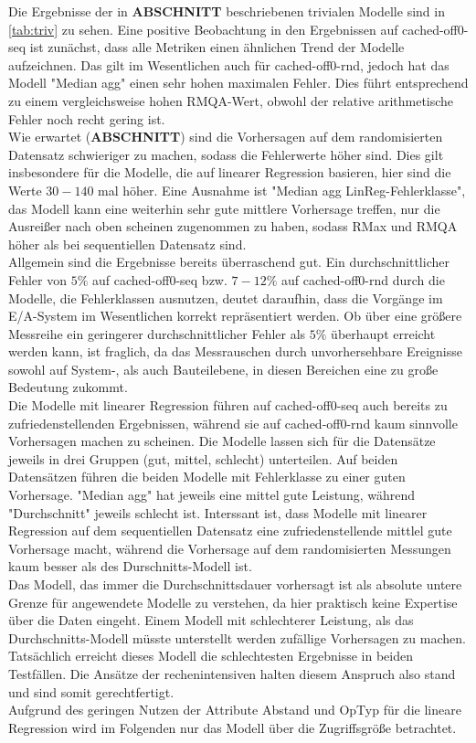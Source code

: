\documentclass[
	12pt,
	a4paper,
	BCOR10mm,
	DIV14,
	listof=totoc,
	bibliography=totoc,
	headsepline
]{scrreprt}
\begin{document}
Die Ergebnisse der in \textbf{ABSCHNITT} beschriebenen trivialen Modelle sind in \ref{tab:triv} zu sehen. Eine positive Beobachtung in den Ergebnissen auf cached-off0-seq ist zunächst, dass alle Metriken einen ähnlichen Trend der  Modelle aufzeichnen. Das gilt im Wesentlichen auch für cached-off0-rnd, jedoch hat das Modell "Median agg" einen sehr hohen maximalen Fehler. Dies führt entsprechend zu einem vergleichsweise hohen RMQA-Wert, obwohl der relative arithmetische Fehler noch recht gering ist. \\
Wie erwartet (\textbf{ABSCHNITT}) sind die Vorhersagen auf dem randomisierten Datensatz schwieriger zu machen, sodass die Fehlerwerte höher sind. Dies gilt insbesondere für die Modelle, die auf linearer Regression basieren, hier sind die Werte $30-140$ mal höher. Eine Ausnahme ist "Median agg LinReg-Fehlerklasse", das Modell kann eine weiterhin sehr gute mittlere Vorhersage treffen, nur die Ausreißer nach oben scheinen zugenommen zu haben, sodass RMax und RMQA höher als bei sequentiellen Datensatz sind.\\
Allgemein sind die Ergebnisse bereits überraschend gut. Ein durchschnittlicher Fehler von $5\%$ auf cached-off0-seq bzw. $7-12\%$ auf cached-off0-rnd durch die Modelle, die Fehlerklassen ausnutzen, deutet daraufhin, dass die Vorgänge im E/A-System im Wesentlichen korrekt repräsentiert werden. Ob über eine größere Messreihe ein geringerer durchschnittlicher Fehler als $5\%$ überhaupt erreicht werden kann, ist fraglich, da das Messrauschen durch unvorhersehbare Ereignisse sowohl auf System-, als auch Bauteilebene, in diesen Bereichen eine zu große Bedeutung zukommt.\\
Die Modelle mit linearer Regression führen auf cached-off0-seq auch bereits zu zufriedenstellenden Ergebnissen, während sie auf cached-off0-rnd kaum sinnvolle Vorhersagen machen zu scheinen. Die Modelle lassen sich für die Datensätze jeweils in drei Gruppen (gut, mittel, schlecht) unterteilen. Auf beiden Datensätzen führen die beiden Modelle mit Fehlerklasse zu einer guten Vorhersage. "Median agg" hat jeweils eine mittel gute Leistung, während "Durchschnitt" jeweils schlecht ist. Interssant ist, dass Modelle mit linearer Regression auf dem sequentiellen Datensatz eine zufriedenstellende mittlel gute Vorhersage macht, während die Vorhersage auf dem randomisierten Messungen kaum besser als des Durschnitts-Modell ist. \\ 
Das Modell, das immer die Durchschnittsdauer vorhersagt ist als absolute untere Grenze für angewendete Modelle zu verstehen, da hier praktisch keine Expertise über die Daten eingeht. Einem Modell mit schlechterer Leistung, als das Durchschnitts-Modell müsste unterstellt werden zufällige Vorhersagen zu machen.
Tatsächlich erreicht dieses Modell die schlechtesten Ergebnisse in beiden Testfällen. Die Ansätze der rechenintensiven halten diesem Anspruch also stand und sind somit gerechtfertigt. \\
Aufgrund des geringen Nutzen der Attribute Abstand und OpTyp für die lineare Regression wird im Folgenden nur das Modell über die Zugriffsgröße betrachtet.\\
\end{document}
